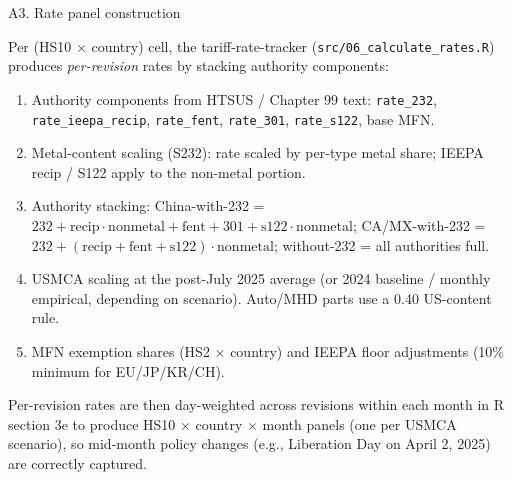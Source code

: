 \documentclass[aspectratio=169,10pt]{beamer}
\begin{document}
\begin{frame}{A3. Rate panel construction}
\hypertarget{appendix_rates}{}

\small

Per (HS10 $\times$ country) cell, the tariff-rate-tracker (\texttt{src/06\_calculate\_rates.R}) produces \emph{per-revision} rates by stacking authority components:

\begin{enumerate}\small
  \item Authority components from HTSUS / Chapter 99 text: \texttt{rate\_232}, \texttt{rate\_ieepa\_recip}, \texttt{rate\_fent}, \texttt{rate\_301}, \texttt{rate\_s122}, base MFN.
  \item Metal-content scaling (S232): rate scaled by per-type metal share; IEEPA recip / S122 apply to the non-metal portion.
  \item Authority stacking: China-with-232 = $232 + \text{recip} \cdot \text{nonmetal} + \text{fent} + 301 + \text{s122} \cdot \text{nonmetal}$; CA/MX-with-232 = $232 + (\text{recip} + \text{fent} + \text{s122}) \cdot \text{nonmetal}$; without-232 = all authorities full.
  \item USMCA scaling at the post-July 2025 average (or 2024 baseline / monthly empirical, depending on scenario). Auto/MHD parts use a 0.40 US-content rule.
  \item MFN exemption shares (HS2 $\times$ country) and IEEPA floor adjustments (10\% minimum for EU/JP/KR/CH).
\end{enumerate}

\medskip

Per-revision rates are then \alert{day-weighted across revisions within each month} in R section 3e to produce HS10 $\times$ country $\times$ month panels (one per USMCA scenario), so mid-month policy changes (e.g., Liberation Day on April 2, 2025) are correctly captured.

\vfill
\hyperlink{slide_formal_model}{}

\end{frame}
\end{document}
